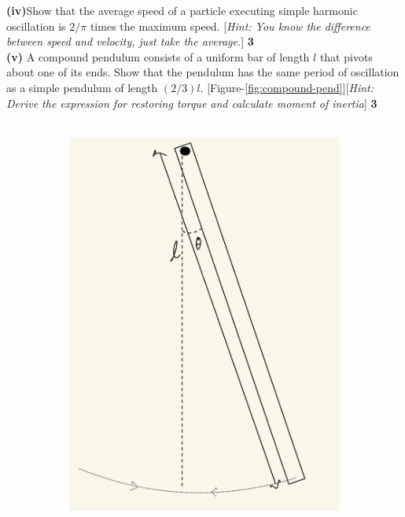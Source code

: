\documentclass[12pt, a4paper]{article}
\begin{document}
{\noindent
\textbf{(iv)}Show that the average speed of a particle executing simple harmonic oscillation is $2/\pi$ 
times the maximum speed. [\textit{Hint: You know the difference between speed and velocity, just take the average.}]
\hfill \textbf{3}\\

\noindent
\textbf{(v)} A compound pendulum consists of a uniform bar of length $l$ that pivots about one of its 
ends. Show that the pendulum has the same period of oscillation as a simple pendulum of length 
$(2/3)l$. [Figure-\ref{fig:compound-pend}][\textit{Hint: Derive the expression for restoring torque and 
calculate moment of inertia}] \hfill \textbf{3}\\ \\
\begin{figure}[t]
    \begin{subfigure}{.5\textwidth}
        \centering
        \includegraphics*[scale=0.1]{figs/compound-pend.jpeg}

\end{subfigure}
\end{figure}}
\end{document}
